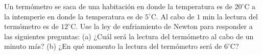 \item Un termómetro se saca de una habitación en donde la temperatura es de $20^\circ\text{C}$ a la intemperie en donde la temperatura es de $5^\circ\text{C}$. Al cabo de $1 \text{ min}$ la lectura del termómetro es de $12^\circ\text{C}$. Use la ley de enfriamiento de Newton para responder a las siguientes preguntas: (a) ¿Cuál será la lectura del termómetro al cabo de un minuto más? (b) ¿En qué momento la lectura del termómetro será de $6^\circ\text{C}$?
